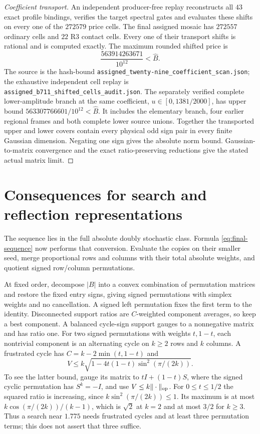 \documentclass[11pt]{article}
\begin{document}
\begin{proof}[Coefficient transport]
An independent producer-free replay reconstructs all $43$ exact
profile bindings, verifies the target spectral gates and evaluates
these shifts on every one of the $272579$ price cells. The final assigned mosaic has $272557$ ordinary cells and $22$ R3
contact cells. Every one of their transport shifts is rational and is
computed exactly. The maximum rounded shifted price is
\[
 \frac{563914263671}{10^{12}}<\widehat B.
\]
The source is the hash-bound
\texttt{assigned\_\allowbreak twenty-nine\_\allowbreak coefficient\_\allowbreak scan.json};
the exhaustive independent cell replay is
\texttt{assigned\_\allowbreak b711\_\allowbreak shifted\_\allowbreak cells\_\allowbreak audit.json}.
The separately verified complete lower-amplitude branch at the same
coefficient, $u\in[0,1381/2000]$, has upper bound
$563307766601/10^{12}<\widehat B$. It includes the elementary branch,
four earlier regional frames and both complete lower source unions.
Together the transported upper and lower covers contain every physical
odd sign pair in every finite Gaussian dimension. Negating one sign
gives the absolute norm bound. Gaussian-to-matrix convergence and the
exact ratio-preserving reductions give the stated actual matrix limit.
\end{proof}

\section{Consequences for search and reflection representations}
The sequence lies in the full absolute doubly stochastic class. Formula \eqref{eq:final-sequence}
now performs that conversion. Evaluate the copies on their smaller seed,
merge proportional rows and columns with their total absolute weights,
and quotient signed row/column permutations.

At fixed order, decompose $|B|$ into a convex combination of permutation
matrices and restore the fixed entry signs, giving signed permutations
with simplex weights and no cancellation. A signed left permutation
fixes the first term to the identity. Disconnected support ratios are
$C$-weighted component averages, so keep a best component. A balanced
cycle-sign support gauges to a nonnegative matrix and has ratio one.
For two signed permutations with weights $t,1-t$, each nontrivial
component is an alternating cycle on $k\ge2$ rows and $k$ columns.
A frustrated cycle has $C=k-2\min(t,1-t)$ and
\[
 V\le k\sqrt{1-4t(1-t)\sin^2(\pi/(2k))}.
\]
To see the latter bound, gauge its matrix to $tI+(1-t)S$, where the
signed cyclic permutation has $S^k=-I$, and use $V\le k\|\cdot\|_{\rm op}$.
For $0\le t\le1/2$ the squared ratio is increasing, since
$k\sin^2(\pi/(2k))\le1$. Its maximum is at most
$k\cos(\pi/(2k))/(k-1)$, which is $\sqrt2$ at $k=2$ and at most
$3/2$ for $k\ge3$. Thus a search near $1.775$ needs frustrated cycles
and at least three permutation terms; this does not assert that three suffice.
\end{document}
